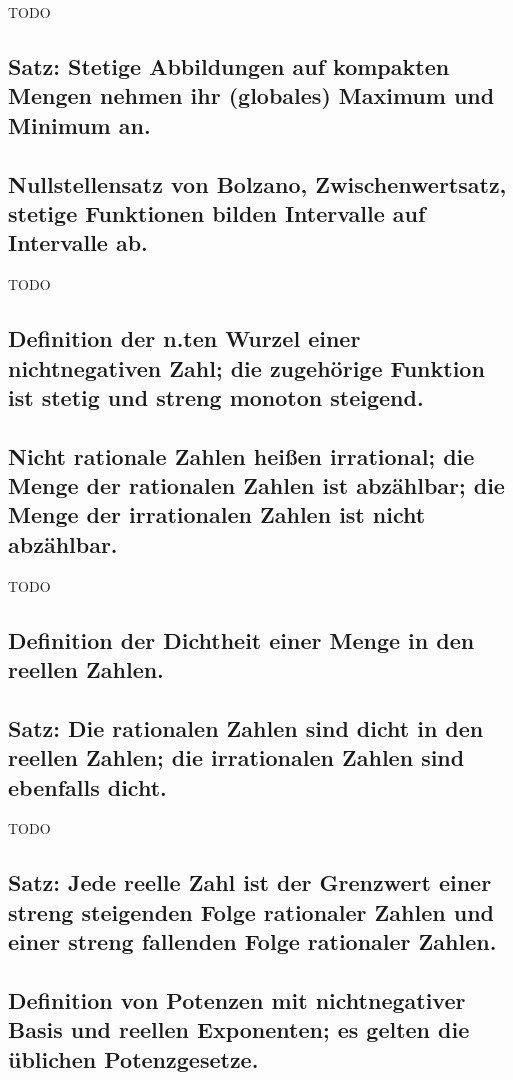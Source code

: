 TODO

\subsection{Satz: Stetige Abbildungen auf kompakten Mengen nehmen ihr (globales) Maximum und Minimum an.}

\subsection{Nullstellensatz von Bolzano, Zwischenwertsatz, stetige Funktionen bilden Intervalle auf Intervalle ab.}

TODO

\subsection{Definition der n.ten Wurzel einer nichtnegativen Zahl; die zugehörige Funktion ist stetig und streng monoton steigend.}

\subsection{Nicht rationale Zahlen heißen irrational; die Menge der rationalen Zahlen ist abzählbar; die Menge der irrationalen Zahlen ist nicht abzählbar.} 

TODO

\subsection{Definition der Dichtheit einer Menge in den reellen Zahlen.}

\subsection{Satz: Die rationalen Zahlen sind dicht in den reellen Zahlen; die irrationalen Zahlen sind ebenfalls dicht.}

TODO

\subsection{Satz: Jede reelle Zahl ist der Grenzwert einer streng steigenden Folge rationaler Zahlen und einer streng fallenden Folge rationaler Zahlen.} 

\subsection{Definition von Potenzen mit nichtnegativer Basis und reellen Exponenten; es gelten die üblichen Potenzgesetze.}

